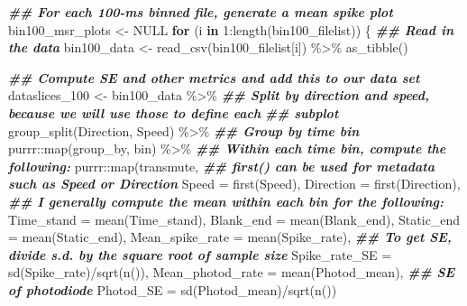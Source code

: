 \documentclass[
]{book}
\newenvironment{Shaded}{\begin{snugshade}}{\end{snugshade}}
\newcommand{\AttributeTok}[1]{\textcolor[rgb]{0.77,0.63,0.00}{#1}}
\newcommand{\ConstantTok}[1]{\textcolor[rgb]{0.00,0.00,0.00}{#1}}
\newcommand{\ControlFlowTok}[1]{\textcolor[rgb]{0.13,0.29,0.53}{\textbf{#1}}}
\newcommand{\DecValTok}[1]{\textcolor[rgb]{0.00,0.00,0.81}{#1}}
\newcommand{\DocumentationTok}[1]{\textcolor[rgb]{0.56,0.35,0.01}{\textbf{\textit{#1}}}}
\newcommand{\FunctionTok}[1]{\textcolor[rgb]{0.00,0.00,0.00}{#1}}
\newcommand{\NormalTok}[1]{#1}
\newcommand{\OtherTok}[1]{\textcolor[rgb]{0.56,0.35,0.01}{#1}}
\newcommand{\SpecialCharTok}[1]{\textcolor[rgb]{0.00,0.00,0.00}{#1}}
\begin{document}
\begin{Shaded}
\begin{Highlighting}[]
\DocumentationTok{\#\# For each 100{-}ms binned file, generate a mean spike plot}
\NormalTok{bin100\_msr\_plots }\OtherTok{\textless{}{-}} \ConstantTok{NULL}
\ControlFlowTok{for}\NormalTok{ (i }\ControlFlowTok{in} \DecValTok{1}\SpecialCharTok{:}\FunctionTok{length}\NormalTok{(bin100\_filelist)) \{}
  \DocumentationTok{\#\# Read in the data}
\NormalTok{  bin100\_data }\OtherTok{\textless{}{-}}
    \FunctionTok{read\_csv}\NormalTok{(bin100\_filelist[i]) }\SpecialCharTok{\%\textgreater{}\%}
    \FunctionTok{as\_tibble}\NormalTok{()}

  \DocumentationTok{\#\# Compute SE and other metrics and add this to our data set}
\NormalTok{  dataslices\_100 }\OtherTok{\textless{}{-}}
\NormalTok{    bin100\_data }\SpecialCharTok{\%\textgreater{}\%}
    \DocumentationTok{\#\# Split by direction and speed, because we will use those to define each}
    \DocumentationTok{\#\# subplot}
    \FunctionTok{group\_split}\NormalTok{(Direction, Speed) }\SpecialCharTok{\%\textgreater{}\%}
    \DocumentationTok{\#\# Group by time bin}
\NormalTok{    purrr}\SpecialCharTok{::}\FunctionTok{map}\NormalTok{(group\_by, bin) }\SpecialCharTok{\%\textgreater{}\%}
    \DocumentationTok{\#\# Within each time bin, compute the following:}
\NormalTok{    purrr}\SpecialCharTok{::}\FunctionTok{map}\NormalTok{(transmute,}
               \DocumentationTok{\#\# first() can be used for metadata such as Speed or Direction}
               \AttributeTok{Speed =} \FunctionTok{first}\NormalTok{(Speed),}
               \AttributeTok{Direction =} \FunctionTok{first}\NormalTok{(Direction),}
               \DocumentationTok{\#\# I generally compute the mean within each bin for the following:}
               \AttributeTok{Time\_stand =} \FunctionTok{mean}\NormalTok{(Time\_stand),}
               \AttributeTok{Blank\_end =} \FunctionTok{mean}\NormalTok{(Blank\_end),}
               \AttributeTok{Static\_end =} \FunctionTok{mean}\NormalTok{(Static\_end),}
               \AttributeTok{Mean\_spike\_rate =} \FunctionTok{mean}\NormalTok{(Spike\_rate),}
               \DocumentationTok{\#\# To get SE, divide s.d. by the square root of sample size}
               \AttributeTok{Spike\_rate\_SE =} \FunctionTok{sd}\NormalTok{(Spike\_rate)}\SpecialCharTok{/}\FunctionTok{sqrt}\NormalTok{(}\FunctionTok{n}\NormalTok{()),}
               \AttributeTok{Mean\_photod\_rate =} \FunctionTok{mean}\NormalTok{(Photod\_mean),}
               \DocumentationTok{\#\# SE of photodiode}
               \AttributeTok{Photod\_SE =} \FunctionTok{sd}\NormalTok{(Photod\_mean)}\SpecialCharTok{/}\FunctionTok{sqrt}\NormalTok{(}\FunctionTok{n}\NormalTok{())}

\end{Highlighting}
\end{Shaded}
\end{document}
